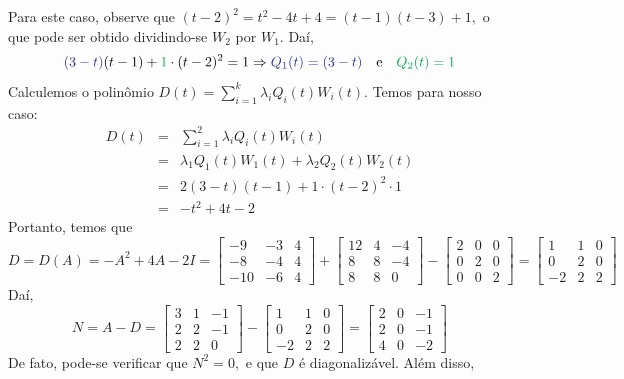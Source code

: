 \documentclass[11pt,a4paper]{article}
\begin{document}
{\medskip
\noindent
Para este caso, observe que $(t-2)^2 = t^2 - 4t + 4 = (t-1)(t-3) + 1,$ o que pode ser obtido dividindo-se $W_2$ por $W_1.$ Daí, \[\textcolor{Blue}{(3-t)}(t-1) + \textcolor{Green}{1} \cdot (t-2)^2  = 1 \Rightarrow  \textcolor{Blue}{Q_1(t) = (3-t)} \quad \mbox{e} \quad \textcolor{Green}{Q_2(t) = 1}\]
Calculemos o polinômio $D(t) = \sum\limits_{i=1}^k \lambda_iQ_i(t)W_i(t)$. Temos para nosso caso:
\[
\begin{array}{rcl}
D(t) &=& \sum\limits_{i=1}^2 \lambda_iQ_i(t)W_i(t) \\
&=& \lambda_1 Q_1(t) W_1(t) + \lambda_2 Q_2(t) W_2(t) \\
&=& 2(3-t)(t-1) + 1 \cdot (t-2)^2 \cdot 1 \\
&=& -t^2 + 4t - 2
\end{array}
\]
Portanto, temos que
\[
D = D(A) = -A^2 + 4A - 2I = \begin{bmatrix}
-9 & -3 & 4 \\
-8 & -4 & 4 \\
-10 & -6 & 4
\end{bmatrix} + \begin{bmatrix}
12 & 4 & -4 \\
8 & 8 & -4 \\
8 & 8 & 0
\end{bmatrix} - \begin{bmatrix}
2 & 0 & 0 \\
0 & 2 & 0 \\
0 & 0 & 2
\end{bmatrix} =  \begin{bmatrix}
1 & 1 & 0 \\
0 & 2 & 0 \\
-2 & 2 & 2
\end{bmatrix}
\]
Daí,
\[
N = A - D =  \begin{bmatrix}
3 & 1 & -1 \\
2 & 2 & -1 \\
2 & 2 & 0
\end{bmatrix}  - \begin{bmatrix}
1 & 1 & 0 \\
0 & 2 & 0 \\
-2 & 2 & 2
\end{bmatrix} = \begin{bmatrix}
2 & 0 & -1 \\
2 & 0 & -1 \\
4 & 0 & -2\end{bmatrix}
\]
De fato, pode-se verificar que $N^2 = 0,$ e que $D$ é diagonalizável. Além disso,
\[
\]}
\end{document}
